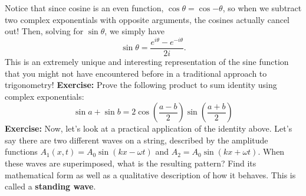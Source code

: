 \documentclass[12pt]{article}
\begin{document}
    Notice that since cosine is an even function, $\cos{\theta} = \cos{-\theta}$, so when we subtract two complex exponentials with opposite arguments, the cosines actually cancel out! Then, solving for $\sin{\theta}$, we simply have \[ \sin{\theta} = \frac{e^{i\theta} - e^{-i\theta}}{2i}. \] This is an extremely unique and interesting representation of the sine function that you might not have encountered before in a traditional approach to trigonometry!
\newline\newline
\textbf{Exercise: } Prove the following product to sum identity using complex exponentials: \[ \sin{a} + \sin{b} = 2\cos(\frac{a - b}{2})\sin(\frac{a + b}{2}) \] 
\newline\newline
\textbf{Exercise: } Now, let's look at a practical application of the identity above. Let's say there are two different waves on a string, described by the amplitude functions $A_1(x, t) = A_0\sin(kx - \omega t)$ and $A_2 = A_0\sin(kx + \omega t)$. When these waves are superimposed, what is the resulting pattern? Find its mathematical form as well as a qualitative description of how it behaves. This is called a \textbf{standing wave}. 
\end{document}
